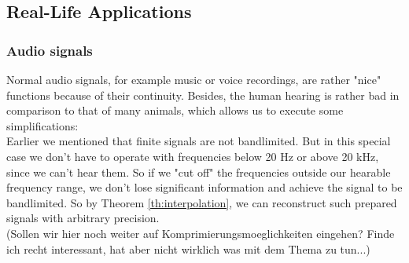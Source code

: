 \documentclass[a4paper, 11pt]{scrreprt}
\begin{document}
\subsection{Real-Life Applications}
\label{se:real-life}

\subsubsection{Audio signals}
Normal audio signals, for example music or voice recordings, are rather "nice" functions because of their continuity. Besides, the human hearing is rather bad in comparison to that of many animals, which allows us to execute some simplifications:\\
Earlier we mentioned that finite signals are not bandlimited. But in this special case we don't have to operate with frequencies below 20 Hz or above 20 kHz, since we can't hear them. So if we "cut off" the frequencies outside our hearable frequency range, we don't lose significant information and achieve the signal to be bandlimited. So by Theorem \ref{th:interpolation}, we can reconstruct such prepared signals with arbitrary precision. \\
(Sollen wir hier noch weiter auf Komprimierungsmoeglichkeiten eingehen? Finde ich recht interessant, hat aber nicht wirklich was mit dem Thema zu tun...)


\nocite{marks02}
\nocite{fornasier03}



\end{document}
